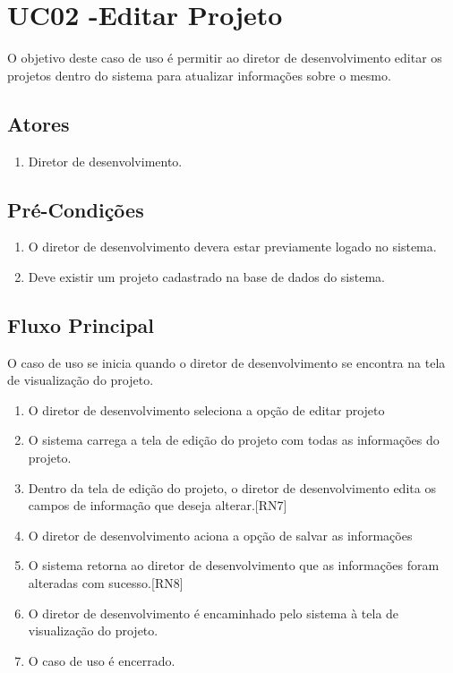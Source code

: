 \section{UC02 -Editar Projeto}

O objetivo deste caso de uso é permitir ao diretor de desenvolvimento editar os projetos dentro do sistema para atualizar informações sobre o mesmo.

\subsection{Atores}

\begin{enumerate}
  \item Diretor de desenvolvimento.
\end{enumerate}

\subsection{Pré-Condições}
\begin{enumerate}
  \item O diretor de desenvolvimento devera estar previamente logado no sistema.
  \item Deve existir um projeto cadastrado na base de dados do sistema.
\end{enumerate}

\subsection{Fluxo Principal}
O caso de uso se inicia quando o diretor de desenvolvimento se encontra na tela de visualização do projeto.

\begin{enumerate}
  \item O diretor de desenvolvimento seleciona a opção de editar projeto
  \item O sistema carrega a tela de edição do projeto com todas as informações do projeto.
  \item Dentro da tela de edição do projeto, o diretor de desenvolvimento edita os campos de informação que deseja alterar.[RN7]
  \item O diretor de desenvolvimento aciona a opção de salvar as informações
  \item O sistema retorna ao diretor de desenvolvimento que as informações foram alteradas com sucesso.[RN8]
  \item O diretor de desenvolvimento é encaminhado pelo sistema à tela de visualização do projeto.
  \item O caso de uso é encerrado.
\end{enumerate}

